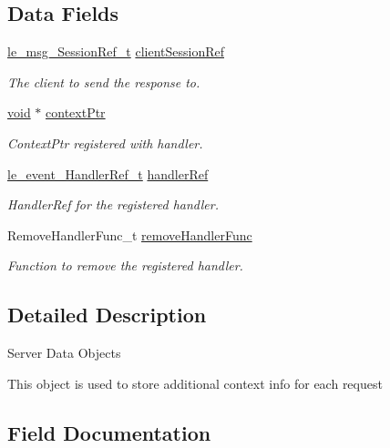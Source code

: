 \subsection*{Data Fields}
\begin{DoxyCompactItemize}
\item 
\hyperlink{le__messaging_8h_aebfc01e15b430a5b4f3038a5bd518904}{le\+\_\+msg\+\_\+\+Session\+Ref\+\_\+t} \hyperlink{struct___server_data__t_a249518cc694f5a90e7f7aba0f36a8007}{client\+Session\+Ref}
\begin{DoxyCompactList}\small\item\em The client to send the response to. \end{DoxyCompactList}\item 
\hyperlink{_t_e_m_p_l_a_t_e__cdef_8h_ac9c84fa68bbad002983e35ce3663c686}{void} $\ast$ \hyperlink{struct___server_data__t_adac545d725c476ff16a0f523d8c223fc}{context\+Ptr}
\begin{DoxyCompactList}\small\item\em Context\+Ptr registered with handler. \end{DoxyCompactList}\item 
\hyperlink{le__event_loop_8h_ae7ab96b8e3441b3d484fcf52aa7a9dad}{le\+\_\+event\+\_\+\+Handler\+Ref\+\_\+t} \hyperlink{struct___server_data__t_a0c61d25f10bcaefdf5be216e27bf5332}{handler\+Ref}
\begin{DoxyCompactList}\small\item\em Handler\+Ref for the registered handler. \end{DoxyCompactList}\item 
Remove\+Handler\+Func\+\_\+t \hyperlink{struct___server_data__t_afc5193eb95ff130ae30cd1ca2de29520}{remove\+Handler\+Func}
\begin{DoxyCompactList}\small\item\em Function to remove the registered handler. \end{DoxyCompactList}\end{DoxyCompactItemize}


\subsection{Detailed Description}
Server Data Objects

This object is used to store additional context info for each request 

\subsection{Field Documentation}
